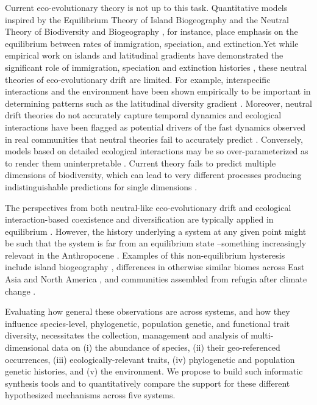 \documentclass[11pt]{article}
\begin{document}
Current eco-evolutionary theory is not up to this task. Quantitative
models inspired by the Equilibrium Theory of Island Biogeography
\cite{MacArthur1967-ux} and the Neutral Theory of Biodiversity and
Biogeography \cite{Hubbell2001-dx}, for instance, place emphasis on the
equilibrium between rates of immigration, speciation, and extinction.Yet
while empirical work on islands and latitudinal gradients have
demonstrated the significant role of immigration, speciation and
extinction histories \cite{Gillespie2004-zv, Owens2017-ja}, these neutral
theories of eco-evolutionary drift are limited. For example,
interspecific interactions and the environment have been shown
empirically to be important in determining patterns such as the
latitudinal diversity gradient
\cite{Janzen1967-fk,Mittelbach2007-ui,Pianka1966-ky}. Moreover, neutral
drift theories do not accurately capture temporal dynamics
\cite{Ricklefs2006-tn, Chisholm2014-mu} and ecological interactions have
been flagged as potential drivers of the fast dynamics observed in real
communities that neutral theories fail to accurately predict
\cite{Rosindell2015-gp,Ricklefs2006-tn}. Conversely, models based on
detailed ecological interactions may be so over-parameterized as to
render them uninterpretable \cite{Rosindell2012-pm}. Current theory
fails to predict multiple dimensions of biodiversity, which can lead to
very different processes producing indistinguishable predictions for
single dimensions
\cite{Chisholm2010-yg,McGill2003-sf,McGill2007-zd,Leibold2017-jv}.

The perspectives from both neutral-like eco-evolutionary drift and
ecological interaction-based coexistence and diversification are
typically applied in equilibrium
\cite{Rominger_undated-cw,Etienne2007-we,Chesson2000-uc,Hubbell2001-dx}.
However, the history underlying a system at any given point might be
such that the system is far from an equilibrium state --something
increasingly relevant in the Anthropocene \cite{Barnosky2012-qz}.
Examples of this non-equilibrium hysteresis include island biogeography
\cite{Ricklefs2001-af}, differences in otherwise similar biomes across
East Asia and North America \cite{Qian2005-co,Yu2017-cc}, and
communities assembled from refugia after climate change
\cite{Carnaval2008-og,Carnaval2009-vd,Burbrink2016-nu}.

Evaluating how general these observations are across systems, and how
they influence species-level, phylogenetic, population genetic, and
functional trait diversity, necessitates the collection, management and
analysis of multi-dimensional data on (i) the abundance of species, (ii)
their geo-referenced occurrences, (iii) ecologically-relevant traits, (iv)
phylogenetic and population genetic histories, and (v) the environment.
We propose to build such informatic synthesis tools and to
quantitatively compare the support for these different hypothesized
mechanisms across five systems.
\end{document}
